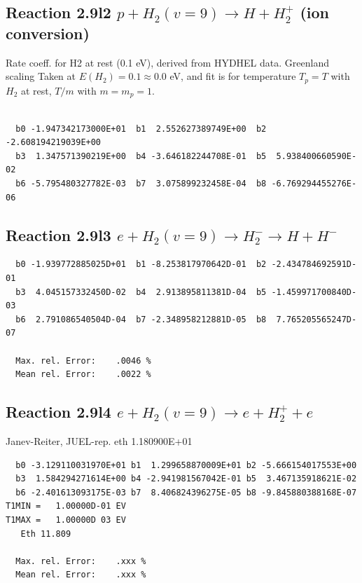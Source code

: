 \documentclass[12pt,dvipdfmx]{article}
\begin{document}
\subsection{
Reaction 2.9l2
$ p + H_2(v=9) \rightarrow H + H_2^+$ (ion conversion)
}
Rate coeff. for H2 at rest (0.1 eV), derived from HYDHEL data. Greenland scaling
Taken at $E(H_2) = 0.1 \approx 0.0$ eV,  and fit is for temperature $T_p=T$ with $H_2$ at rest,
$T/m$ with $m=m_p=1$.

\begin{small}\begin{verbatim}

  b0 -1.947342173000E+01  b1  2.552627389749E+00  b2 -2.608194219039E+00
  b3  1.347571390219E+00  b4 -3.646182244708E-01  b5  5.938400660590E-02
  b6 -5.795480327782E-03  b7  3.075899232458E-04  b8 -6.769294455276E-06

\end{verbatim}\end{small}

\newpage


\subsection{
Reaction 2.9l3
 $ e + H_2(v=9) \rightarrow H_2^- \rightarrow H + H^-$
}


\begin{small}\begin{verbatim}
  b0 -1.939772885025D+01  b1 -8.253817970642D-01  b2 -2.434784692591D-01
  b3  4.045157332450D-02  b4  2.913895811381D-04  b5 -1.459971700840D-03
  b6  2.791086540504D-04  b7 -2.348958212881D-05  b8  7.765205565247D-07

  Max. rel. Error:    .0046 %
  Mean rel. Error:    .0022 %
\end{verbatim}\end{small}

\subsection{
Reaction 2.9l4
 $ e + H_2(v=9) \rightarrow e + H_2^+  + e$
}
Janev-Reiter, JUEL-rep. eth 1.180900E+01

\begin{small}\begin{verbatim}
  b0 -3.129110031970E+01 b1  1.299658870009E+01 b2 -5.666154017553E+00
  b3  1.584294271614E+00 b4 -2.941981567042E-01 b5  3.467135918621E-02
  b6 -2.401613093175E-03 b7  8.406824396275E-05 b8 -9.845880388168E-07
T1MIN =   1.00000D-01 EV
T1MAX =   1.00000D 03 EV
   Eth 11.809

  Max. rel. Error:    .xxx %
  Mean rel. Error:    .xxx %
\end{verbatim}\end{small}
\end{document}
